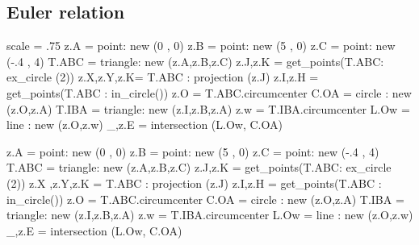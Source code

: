 \subsection{Euler relation} %
\label{sub:euler_relation}
\begin{minipage}{.5\textwidth}
\begin{tkzexample}[latex=0cm,small,code only]
\begin{tkzelements}
 scale      =  .75
 z.A        = point: new (0 , 0)
 z.B        = point: new (5 , 0)
 z.C        = point: new (-.4 , 4)
 T.ABC      = triangle: new (z.A,z.B,z.C)
 z.J,z.K    = get_points(T.ABC: ex_circle (2))
 z.X,z.Y,z.K= T.ABC : projection (z.J)
 z.I,z.H    = get_points(T.ABC : in_circle())
 z.O        = T.ABC.circumcenter
 C.OA       = circle : new (z.O,z.A)
 T.IBA      = triangle: new (z.I,z.B,z.A)
 z.w        = T.IBA.circumcenter
 L.Ow       = line : new (z.O,z.w)
 _,z.E      = intersection (L.Ow, C.OA)
\end{tkzelements}
\end{tkzexample}
\end{minipage}
\begin{minipage}{.5\textwidth}
\begin{tkzelements}
z.A   = point: new (0 , 0)
z.B   = point: new (5 , 0)
   z.C    = point: new (-.4 , 4)
T.ABC     = triangle: new (z.A,z.B,z.C)
z.J,z.K   = get_points(T.ABC: ex_circle (2))
z.X ,z.Y,z.K  = T.ABC : projection (z.J)
z.I,z.H   = get_points(T.ABC : in_circle())
z.O   = T.ABC.circumcenter
C.OA      = circle : new (z.O,z.A)
T.IBA     = triangle: new (z.I,z.B,z.A)
z.w   = T.IBA.circumcenter
L.Ow      = line : new (z.O,z.w)
_,z.E     = intersection (L.Ow, C.OA)
\end{tkzelements}

\hspace*{\fill}
\hspace*{\fill}
\end{minipage}

